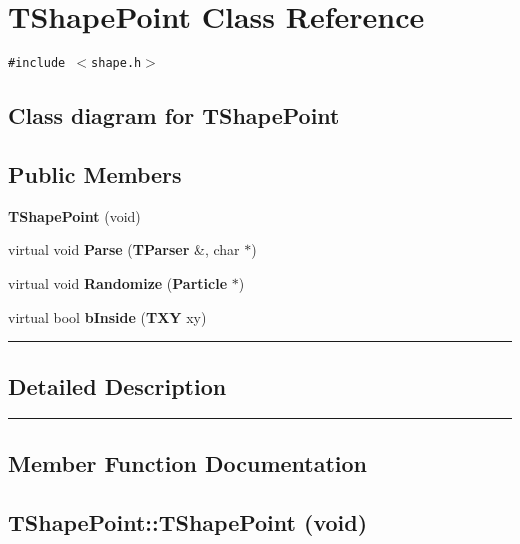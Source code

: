 \section{TShapePoint  Class Reference}
\label{TShapePoint}


{\tt \#include $<$shape.h$>$}

\subsection*{Class diagram for TShapePoint}
\begin{figure}[H]
\begin{center}
\leavevmode
\setlength{\epsfysize}{2cm}
\end{center}
\end{figure}
\subsection*{Public Members}
\begin{CompactItemize}
\item 
{\bf TShape\-Point} (void)
\item 
virtual void {\bf Parse} ({\bf TParser} \&, char $\ast$)
\item 
virtual void {\bf Randomize} ({\bf Particle} $\ast$)
\item 
virtual bool {\bf b\-Inside} ({\bf TXY} xy)
\end{CompactItemize}
\vspace{0.4cm}\hrule\vspace{0.2cm}
\subsection*{Detailed Description}
\vspace{0.4cm}\hrule\vspace{0.2cm}
\subsection*{Member Function Documentation}
\label{TShapePoint_a0}
\subsection{\setlength{\rightskip}{0pt plus 5cm}TShape\-Point::TShape\-Point (void)}

